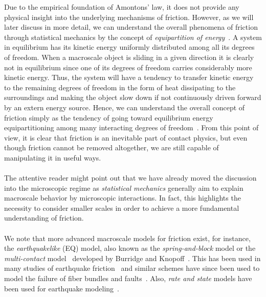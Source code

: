 Due to the empirical foundation of Amontons’ law, it does not provide any
physical insight into the underlying mechanisms of friction. However, as we will
later discuss in more detail, we can understand the overall phenomena of
friction through statistical mechanics by the concept of \textit{equipartition
of energy}~\cite{Manini_2016}. A system in equilibrium has its kinetic energy
uniformly distributed among all its degrees of freedom. When a macroscale object
is sliding in a given direction it is clearly not in equilibrium since one of
its degrees of freedom carries considerably more kinetic energy. Thus, the
system will have a tendency to transfer kinetic energy to the remaining
degrees of freedom in the form of heat dissipating to the surroundings and making the object slow down if not continuously driven forward by an extern energy source.  Hence, we can understand the overall concept of friction simply
as the tendency of going toward equilibrium energy equipartitioning among many
interacting degrees of freedom~\cite{Manini_2016}. From this point of view, it is
clear that friction is an inevitable part of contact physics, but even though
friction cannot be removed altogether, we are still capable of manipulating it
in useful ways. \\
\\
The attentive reader might point out that we have already moved the discussion
into the microscopic regime as \textit{statistical mechanics} generally
aim to explain macroscale behavior by microscopic interactions. In fact, this 
highlights the necessity to consider smaller scales in order to achieve a more fundamental understanding of friction.
\\
\\
We note that more advanced macroscale models for friction exist, for instance, the \textit{earthquakelike} (EQ) model, also known as the \textit{spring-and-block} model or the \textit{multi-contact} model~\cite{Mani_2016} developed by Burridge and Knopoff~\cite{Burridge_1967}. This has been used in many studies of earthquake friction~\cite{PhysRevLett.88.096102} and similar schemes have since been used to model the failure of fiber bundles and faults~\cite{newman_failure_1991, Smalley_1985}. Also, \textit{rate and state} models have been used for earthquake modeling~\cite{SELVADURAI2023229689}.







